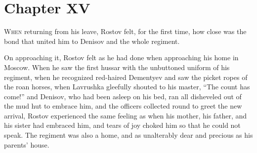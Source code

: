 
\chapter*{Chapter XV}
\ifaudio     
{} 
\fi

\lettrine[lines=2, loversize=0.3, lraise=0]{\initfamily W}{hen}
returning from his leave, Rostov felt, for the first time,
how close was the bond that united him to Denisov and the whole
regiment.

On approaching it, Rostov felt as he had done when approaching
his home in Moscow. When he saw the first hussar with the
unbuttoned uniform of his regiment, when he recognized red-haired
Dementyev and saw the picket ropes of the roan horses, when
Lavrushka gleefully shouted to his master, ``The count has
come!'' and Denisov, who had been asleep on his bed, ran all
disheveled out of the mud hut to embrace him, and the officers
collected round to greet the new arrival, Rostov experienced the
same feeling as when his mother, his father, and his sister had
embraced him, and tears of joy choked him so that he could not
speak.  The regiment was also a home, and as unalterably dear and
precious as his parents' house.

